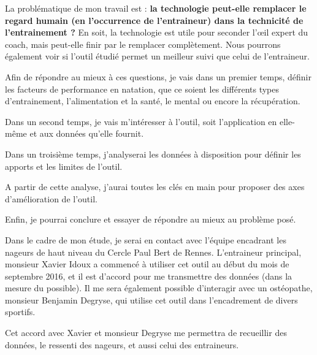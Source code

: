 La problématique de mon travail est : \textbf{la technologie peut-elle remplacer le regard humain (en l'occurrence de l'entraineur) dans la technicité de l'entrainement ?} En soit, la technologie est utile pour seconder l'œil expert du coach, mais peut-elle finir par le remplacer complètement. Nous pourrons également voir si l'outil étudié permet un meilleur suivi que celui de l'entraineur.

\vspace{12pt}

Afin de répondre au mieux à ces questions, je vais dans un premier temps, définir les facteurs de performance en natation, que ce soient les différents types d'entrainement, l'alimentation et la santé, le mental ou encore la récupération.

Dans un second temps, je vais m'intéresser à l'outil, soit l'application en elle-même et aux données qu'elle fournit.

Dans un troisième temps, j'analyserai les données à disposition pour définir les apports et les limites de l'outil.

A partir de cette analyse, j'aurai toutes les clés en main pour proposer des axes d'amélioration de l'outil.

Enfin, je pourrai conclure et essayer de répondre au mieux au problème posé.

\vspace{12pt}

Dans le cadre de mon étude, je serai en contact avec l'équipe encadrant les nageurs de haut niveau du Cercle Paul Bert de Rennes. L'entraineur principal, monsieur Xavier Idoux a commencé à utiliser cet outil au début du mois de septembre 2016, et il est d'accord pour me transmettre des données (dans la mesure du possible). Il me sera également possible d'interagir avec un ostéopathe, monsieur Benjamin Degryse, qui utilise cet outil dans l'encadrement de divers sportifs.

Cet accord avec Xavier et monsieur Degryse me permettra de recueillir des données, le ressenti des nageurs, et aussi celui des entraineurs. 
